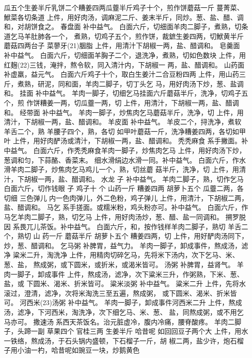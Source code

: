 \documentclass[12pt,UTF8]{ctexbook}
\begin{document}
瓜五个生姜半斤乳饼二个糟姜四两瓜虀半斤鸡子十个，煎作饼蘑菇一斤
蔓菁菜、鮲菜各切条道
上件，用好肉汤，调麻泥二斤、姜末半斤，同炒。葱、盐、醋、调
和，对胡饼食之。
春盘面 补中益气。
白面六斤，切细面羊肉二脚子，煮熟，切条道乞马羊肚肺各一个，
煮熟，切鸡子五个，煎作饼，裁鏣生姜四两，切鮲黄半斤蘑菇四两台子
菜蓼牙(21)胭脂
上件，用清汁下胡椒一两，盐、醋调和。
皂羹面 补中益气。
白面六斤，切细面羊胸子二个，退洗净，煮熟，切如色数块
上件，用红麹(22)三钱，淹拌，熬令软，同入清汁内，下胡椒一
两，盐、醋调和。
山药面 补虚羸，益元气。
白面六斤鸡子十个，取白生姜汁二合豆粉四两
上件，用山药三斤，煮熟，研泥，同和面，羊肉二脚子，切丁头乞
马，用好肉汤下炒，葱、盐调和。
挂面 补中益气。
羊肉一脚子，切细乞马挂面六斤蘑菇半斤，洗净，切鸡子五个，煎
作饼糟姜一两，切瓜虀一两，切
上件，用清汁，下胡椒一两，盐、醋调和。
经带面 补中益气。
羊肉一脚子，炒焦肉乞马蘑菇半斤，洗净，切
上件，用清汁，下胡椒一两，盐、醋调和。
羊皮面 补中益气。
羊皮二个，挦洗净，煮软 羊舌二个，熟 羊腰子四个，熟，各切
如甲叶蘑菇一斤，洗净糟姜四两，各切如甲叶
上件，用好肉酽汤或清汁，下胡椒一两，盐、醋调和。
秃秃麻食 系手撇面。补中益气。
白面六斤，作秃秃麻食羊肉一脚子，炒焦肉乞马
上件，用好肉汤下炒，葱调和匀，下蒜酪、香菜末。
细水滑绢边水滑一同。补中益气。
白面六斤，作水滑羊肉二脚子，炒焦肉乞马鸡儿一个，熟，切丝蘑
菇半斤，洗净，切
上件，用清汁，下胡椒一两，盐、醋调和。
水龙 子 补中益气。
羊肉二脚子，熟，切作乞马 白面六斤，切作钱眼 子 鸡子十
个 山药一斤 糟姜四两 胡萝卜五个 瓜虀二两，各切细 三色弹儿
内一色肉弹儿，外二色粉，鸡子弹儿
上件，用清汁，下胡椒二两，盐、醋调和。
马乞 系手搓面。或糯米粉，鸡头粉亦可。补中益气。
白面六斤，作马乞羊肉二脚子，熟，切乞马
上件，用好肉汤炒，葱、醋、盐一同调和。
搠罗脱因 系畏兀儿茶饭。补中益气。
白面六斤，和，按作钱样羊肉二脚子，熟切 羊舌二个，熟切 山
药一斤 蘑菇半斤 胡萝卜五个 糟姜四两，切
上件，用好酽肉汤同下，炒，葱、醋调和。
乞马粥 补脾胃，益气力。
羊肉一脚子，卸成事件，熬成汤，滤净 粱米二升，淘洗净
上件，用精肉切碎乞马，先将米下汤内，次下乞马、米、葱、盐，
熬成粥，或下圆米，或折米，或渴米皆可。
汤粥 补脾胃，益肾气。
羊肉一脚子，卸成事件
上件，熬成汤，滤净，次下粱米三升，作粥熟，下米、葱、盐，或
下圆米、渴米、折米皆可。
粱米淡粥 补中益气。
粱米二升
上件，先将水滚过，澄清，滤净，次将米淘洗三至五遍，熬成粥，
或下圆米、渴米、折米皆可。
河西米(23)汤粥 补中益气。
羊肉一脚子，卸成事件河西米二升
上件，熬成汤，滤净，下河西米，淘洗净，次下细乞马、米、葱、
盐，同熬成粥，或不用乞马亦可。
撒速汤 系西天茶饭名。治元脏虚冷，腹内冷痛，腰脊酸疼。
羊肉二脚子，头蹄一副 草果四个 官桂三两 生姜半斤 哈昔呢
如回回豆子两个大
上件，用水一铁络，熬成汤，于石头锅内盛顿，下石榴子一斤，胡
椒二两，盐少许，炮石榴子用小油一杓，哈昔呢如豌豆一块，炒鹅黄色
\end{document}
